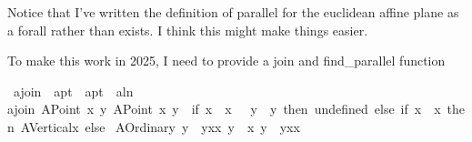 \begin{isabellebody}
\begin{isamarkuptext}%
Notice that I've written the definition of parallel for the euclidean affine plane
as a forall rather than exists. I think this might make things easier.%
\end{isamarkuptext}\isamarkuptrue%
%
\begin{isamarkuptext}%
To make this work in 2025, I need to provide a join and find_parallel function%
\end{isamarkuptext}\isamarkuptrue%
\isamarkupfalse%
\ a{}join\ {\isacharcolon}{\kern0pt}{\isacharcolon}{\kern0pt}\ {\isachardoublequoteopen}a{}pt\ {\isasymRightarrow}\ a{}pt\ {\isasymRightarrow}\ a{}ln{\isachardoublequoteclose}\ \isanewline
{\isachardoublequoteopen}a{}join\ {\isacharparenleft}{\kern0pt}A{}Point\ x{}\ y{}{\isacharparenright}{\kern0pt}\ {\isacharparenleft}{\kern0pt}A{}Point\ x{}\ y{}{\isacharparenright}{\kern0pt}\ {\isacharequal}{\kern0pt}\ {\isacharparenleft}{\kern0pt}if\ {\isacharparenleft}{\kern0pt}{\isacharparenleft}{\kern0pt}x{}\ {\isacharequal}{\kern0pt}\ x{}{\isacharparenright}{\kern0pt}\ \ {\isasymand}\ {\isacharparenleft}{\kern0pt}y{}\ {\isacharequal}{\kern0pt}\ y{}{\isacharparenright}{\kern0pt}{\isacharparenright}{\kern0pt}\ then\ undefined\ else\ if\ {\isacharparenleft}{\kern0pt}x{}\ {\isacharequal}{\kern0pt}\ x{}{\isacharparenright}{\kern0pt}\ then\ A{}Vertical{\isacharparenleft}{\kern0pt}x{}{\isacharparenright}{\kern0pt}\ else\ \isanewline
{\isacharparenleft}{\kern0pt}A{}Ordinary\ {\isacharparenleft}{\kern0pt}{\isacharparenleft}{\kern0pt}y{}\ {\isacharminus}{\kern0pt}\ y{}{\isacharparenright}{\kern0pt}{\isacharslash}{\kern0pt}{\isacharparenleft}{\kern0pt}x{}{\isacharminus}{\kern0pt}x{}{\isacharparenright}{\kern0pt}{\isacharparenright}{\kern0pt}\ {\isacharparenleft}{\kern0pt}y{}\ {\isacharminus}{\kern0pt}\ x{}{\isacharasterisk}{\kern0pt}\ {\isacharparenleft}{\kern0pt}y{}\ {\isacharminus}{\kern0pt}\ y{}{\isacharparenright}{\kern0pt}{\isacharslash}{\kern0pt}{\isacharparenleft}{\kern0pt}x{}{\isacharminus}{\kern0pt}x{}{\isacharparenright}{\kern0pt}{\isacharparenright}{\kern0pt}{\isacharparenright}{\kern0pt}{\isacharparenright}{\kern0pt}{\isachardoublequoteclose}\isanewline

\end{isabellebody}
